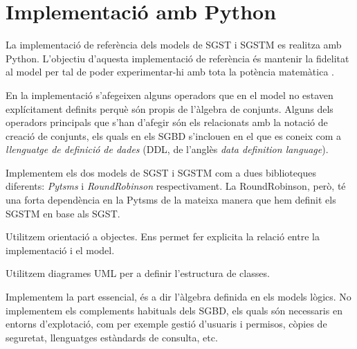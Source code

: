 

\chapter{Implementació amb Python}


La implementació de referència dels models de SGST i SGSTM es realitza
amb Python. L'objectiu d'aquesta implementació de
referència és mantenir la fidelitat al model per tal de poder
experimentar-hi amb tota la potència matemàtica .

En la implementació s'afegeixen alguns operadors que en el model no
estaven explícitament definits perquè són propis de l'àlgebra de
conjunts. Alguns dels operadors principals que s'han d'afegir són els
relacionats amb la notació de creació de
conjunts, %
els quals en els SGBD s'inclouen en el que es coneix com a
\emph{llenguatge de definició de dades} (DDL, de l'anglès \emph{data
  definition language}).





Implementem els dos models de SGST i SGSTM com a dues biblioteques
diferents: \emph{Pytsms} i \emph{RoundRobinson} respectivament. La
RoundRobinson, però, té una forta dependència en la
Pytsms de la mateixa manera que hem definit els SGSTM en base
als SGST.


Utilitzem orientació a objectes. Ens permet fer explicita la relació
entre la implementació i el model. 

Utilitzem diagrames UML per a definir l'estructura de classes. 


Implementem la part essencial, és a dir l'àlgebra definida en els
models lògics. No implementem els complements habituals dels SGBD, els
quals són necessaris en entorns d'explotació, com per exemple gestió
d'usuaris i permisos, còpies de seguretat, llenguatges estàndards de
consulta, etc.




